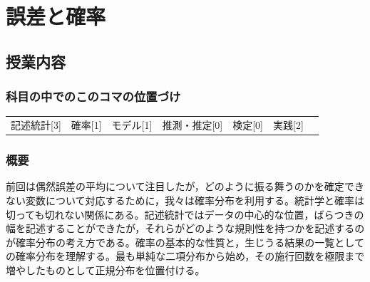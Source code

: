 \section{誤差と確率}
\label{s07_probability}

\subsection{授業内容}
\subsubsection{科目の中でのこのコマの位置づけ}
\begin{tabular}[t]{ccccccc}
	記述統計[3] & 確率[1] & モデル[1] & 推測・推定[0] & 検定[0] & 実践[2]
\end{tabular}
\subsubsection{概要}
前回は偶然誤差の平均について注目したが，どのように振る舞うのかを確定できない変数について対応するために，我々は確率分布を利用する。統計学と確率は切っても切れない関係にある。記述統計ではデータの中心的な位置，ばらつきの幅を記述することができたが，それらがどのような規則性を持つかを記述するのが確率分布の考え方である。確率の基本的な性質と，生じうる結果の一覧としての確率分布を理解する。最も単純な二項分布から始め，その施行回数を極限まで増やしたものとして正規分布を位置付ける。
